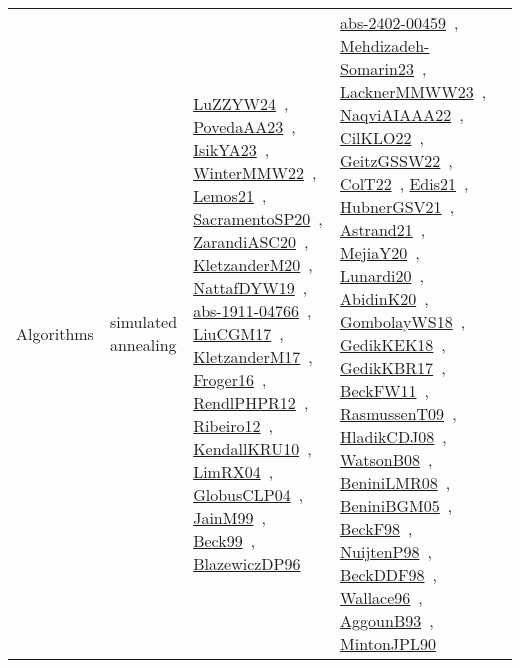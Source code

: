 {\begin{longtable}{lp{3cm}>{\raggedright\arraybackslash}p{6cm}>{\raggedright\arraybackslash}p{6cm}>{\raggedright\arraybackslash}p{8cm}}
\index{simulated annealing}\index{Algorithms!simulated annealing}Algorithms & simulated annealing & \href{../works/LuZZYW24.pdf}{LuZZYW24}~\cite{LuZZYW24}, \href{../works/PovedaAA23.pdf}{PovedaAA23}~\cite{PovedaAA23}, \href{../works/IsikYA23.pdf}{IsikYA23}~\cite{IsikYA23}, \href{../works/WinterMMW22.pdf}{WinterMMW22}~\cite{WinterMMW22}, \href{../works/Lemos21.pdf}{Lemos21}~\cite{Lemos21}, \href{../works/SacramentoSP20.pdf}{SacramentoSP20}~\cite{SacramentoSP20}, \href{../works/ZarandiASC20.pdf}{ZarandiASC20}~\cite{ZarandiASC20}, \href{../works/KletzanderM20.pdf}{KletzanderM20}~\cite{KletzanderM20}, \href{../works/NattafDYW19.pdf}{NattafDYW19}~\cite{NattafDYW19}, \href{../works/abs-1911-04766.pdf}{abs-1911-04766}~\cite{abs-1911-04766}, \href{../works/LiuCGM17.pdf}{LiuCGM17}~\cite{LiuCGM17}, \href{../works/KletzanderM17.pdf}{KletzanderM17}~\cite{KletzanderM17}, \href{../works/Froger16.pdf}{Froger16}~\cite{Froger16}, \href{../works/RendlPHPR12.pdf}{RendlPHPR12}~\cite{RendlPHPR12}, \href{../works/Ribeiro12.pdf}{Ribeiro12}~\cite{Ribeiro12}, \href{../works/KendallKRU10.pdf}{KendallKRU10}~\cite{KendallKRU10}, \href{../works/LimRX04.pdf}{LimRX04}~\cite{LimRX04}, \href{../works/GlobusCLP04.pdf}{GlobusCLP04}~\cite{GlobusCLP04}, \href{../works/JainM99.pdf}{JainM99}~\cite{JainM99}, \href{../works/Beck99.pdf}{Beck99}~\cite{Beck99}, \href{../works/BlazewiczDP96.pdf}{BlazewiczDP96}~\cite{BlazewiczDP96} & \href{../works/abs-2402-00459.pdf}{abs-2402-00459}~\cite{abs-2402-00459}, \href{../works/Mehdizadeh-Somarin23.pdf}{Mehdizadeh-Somarin23}~\cite{Mehdizadeh-Somarin23}, \href{../works/LacknerMMWW23.pdf}{LacknerMMWW23}~\cite{LacknerMMWW23}, \href{../works/NaqviAIAAA22.pdf}{NaqviAIAAA22}~\cite{NaqviAIAAA22}, \href{../works/CilKLO22.pdf}{CilKLO22}~\cite{CilKLO22}, \href{../works/GeitzGSSW22.pdf}{GeitzGSSW22}~\cite{GeitzGSSW22}, \href{../works/ColT22.pdf}{ColT22}~\cite{ColT22}, \href{../works/Edis21.pdf}{Edis21}~\cite{Edis21}, \href{../works/HubnerGSV21.pdf}{HubnerGSV21}~\cite{HubnerGSV21}, \href{../works/Astrand21.pdf}{Astrand21}~\cite{Astrand21}, \href{../works/MejiaY20.pdf}{MejiaY20}~\cite{MejiaY20}, \href{../works/Lunardi20.pdf}{Lunardi20}~\cite{Lunardi20}, \href{../works/AbidinK20.pdf}{AbidinK20}~\cite{AbidinK20}, \href{../works/GombolayWS18.pdf}{GombolayWS18}~\cite{GombolayWS18}, \href{../works/GedikKEK18.pdf}{GedikKEK18}~\cite{GedikKEK18}, \href{../works/GedikKBR17.pdf}{GedikKBR17}~\cite{GedikKBR17}, \href{../works/BeckFW11.pdf}{BeckFW11}~\cite{BeckFW11}, \href{../works/RasmussenT09.pdf}{RasmussenT09}~\cite{RasmussenT09}, \href{../works/HladikCDJ08.pdf}{HladikCDJ08}~\cite{HladikCDJ08}, \href{../works/WatsonB08.pdf}{WatsonB08}~\cite{WatsonB08}, \href{../works/BeniniLMR08.pdf}{BeniniLMR08}~\cite{BeniniLMR08}, \href{../works/BeniniBGM05.pdf}{BeniniBGM05}~\cite{BeniniBGM05}, \href{../works/BeckF98.pdf}{BeckF98}~\cite{BeckF98}, \href{../works/NuijtenP98.pdf}{NuijtenP98}~\cite{NuijtenP98}, \href{../works/BeckDDF98.pdf}{BeckDDF98}~\cite{BeckDDF98}, \href{../works/Wallace96.pdf}{Wallace96}~\cite{Wallace96}, \href{../works/AggounB93.pdf}{AggounB93}~\cite{AggounB93}, \href{../works/MintonJPL90.pdf}{MintonJPL90}~\cite{MintonJPL90} & 
\end{longtable}}
